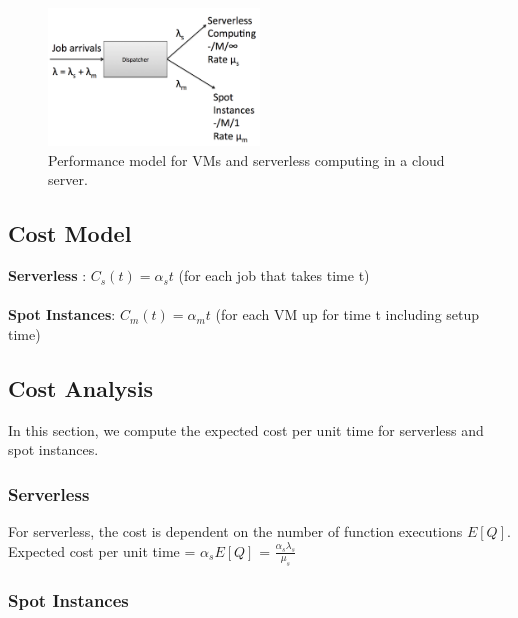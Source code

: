 \documentclass[letter,11pt]{article}
\begin{document}
\begin{figure}[h]
    \centering
    \includegraphics[width=0.5\textwidth]{dispatcher}
    \caption{Performance model for VMs and serverless computing in a cloud server.}
    \label{fig:model}
\end{figure}

\subsection{Cost Model} 

\textbf{Serverless} : $C_s(t) = \alpha_s t$ (for each job that takes time t) \\ \\
\textbf{Spot Instances}:  $C_m(t) = \alpha_m t$ (for each VM up for time t including setup time) 

\subsection{Cost Analysis}

In this section, we compute the expected cost per unit time for serverless and spot instances. 

\subsubsection{Serverless}

For serverless, the cost is dependent on the number of function executions $E[Q]$. \\
Expected cost per unit time = $\alpha_s E[Q]$ = $\frac{\alpha_s \lambda_s}{\mu_s}$

\subsubsection{Spot Instances} 
\end{document}

